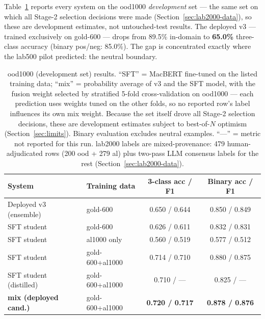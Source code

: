 \documentclass[11pt,a4paper]{article}
\begin{document}
Table~\ref{tab:ood} reports every system on the ood1000
\emph{development} set --- the same set on which all Stage-2 selection
decisions were made (Section~\ref{sec:lab2000-data}), so these are
development estimates, not untouched-test results. The deployed v3 ---
trained exclusively on gold-600 --- drops from
89.5\% in-domain to \textbf{65.0\%} three-class accuracy (binary
pos/neg: 85.0\%). The gap is concentrated exactly where the lab500
pilot predicted: the neutral boundary.

\begin{table}[H]
\centering\small
\caption{ood1000 (development set) results. ``SFT'' = MacBERT
fine-tuned on the listed
training data; ``mix'' = probability average of v3 and the SFT model,
with the fusion weight selected by stratified 5-fold cross-validation
on ood1000 --- each prediction uses weights tuned on the other folds,
so no reported row's label influences its own mix weight. Because the
set itself drove all Stage-2 selection decisions, these are
development estimates subject to best-of-$N$ optimism
(Section~\ref{sec:limits}). Binary
evaluation excludes neutral examples. ``---'' = metric not reported
for this run. lab2000 labels are mixed-provenance: 479
human-adjudicated rows (200 ood + 279 al) plus two-pass LLM consensus
labels for the rest (Section~\ref{sec:lab2000-data}).}
\label{tab:ood}
\begin{tabular}{llcc}
\toprule
System & Training data & 3-class acc / F1 & Binary acc / F1 \\
\midrule
Deployed v3 (ensemble)      & gold-600        & 0.650 / 0.644 & 0.850 / 0.849 \\
SFT student                 & gold-600        & 0.626 / 0.611 & 0.832 / 0.831 \\
SFT student                 & al1000 only     & 0.560 / 0.519 & 0.577 / 0.512 \\
SFT student                 & gold-600+al1000 & 0.714 / 0.710 & 0.880 / 0.875 \\
SFT student (distilled)     & gold-600+al1000 & 0.710 / ---   & 0.825 / ---   \\
\textbf{mix (deployed cand.)}& gold-600+al1000 & \textbf{0.720 / 0.717} & \textbf{0.878 / 0.876} \\
\bottomrule
\end{tabular}
\end{table}
\end{document}
